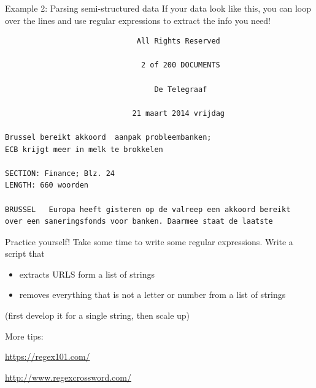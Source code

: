 \begin{frame}{Example 2: Parsing semi-structured data}
If your data look like this, you can loop over the lines and use regular expressions to extract the info you need!

\begin{lstlisting}
                              All Rights Reserved

                               2 of 200 DOCUMENTS

                                  De Telegraaf

                             21 maart 2014 vrijdag

Brussel bereikt akkoord  aanpak probleembanken;
ECB krijgt meer in melk te brokkelen

SECTION: Finance; Blz. 24
LENGTH: 660 woorden

BRUSSEL   Europa heeft gisteren op de valreep een akkoord bereikt 
over een saneringsfonds voor banken. Daarmee staat de laatste
\end{lstlisting}

\end{frame}



\begin{frame}{Practice yourself!}
	Take some time to write some regular expressions.
	Write a script that
\begin{itemize}
	\item extracts URLS form a list of strings
	\item removes everything that is not a letter or number from a list of strings
\end{itemize}
(first develop it for a single string, then scale up)

More tips:

\large{\url{https://regex101.com/}}

\large{\url{http://www.regexcrossword.com/}}
\end{frame}

